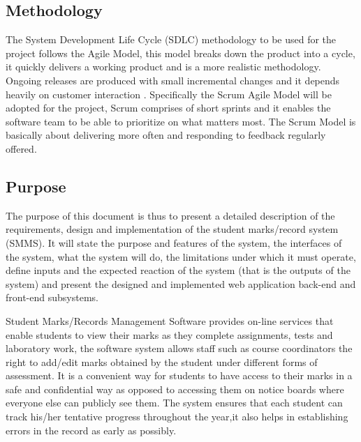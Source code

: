 \documentclass[10pt,onecolumn]{MainDocument}
\begin{document}
\subsection{Methodology}

The System Development Life Cycle (SDLC) methodology to be used for the project follows the Agile Model, this model breaks down the product into a cycle, it quickly delivers a working product and is a more realistic methodology. Ongoing releases are produced with small incremental changes and it depends heavily on customer interaction \cite{ref7}. Specifically the Scrum Agile Model will be adopted for the project, Scrum comprises of short sprints and it enables the software team to be able to prioritize on what matters most. The Scrum Model is basically about delivering more often and responding to feedback regularly offered\cite{ref8}.           

\subsection{Purpose}

The purpose of this document is thus to present a detailed description of the requirements, design and implementation of the student marks/record system (SMMS). It will state the purpose and features of the system, the interfaces of the system, what the system will do, the limitations under which it must operate, define inputs and the expected reaction of the system (that is the outputs of the system) and present the designed and implemented web application back-end and front-end subsystems. 

Student Marks/Records Management Software provides on-line services that enable students to view their marks as they complete  assignments, tests and laboratory work, the software system allows staff such as course coordinators the right to add/edit marks obtained by the student under different forms of assessment. It is a convenient way for students to have access to their marks in a safe and confidential way as opposed to accessing them on notice boards where everyone else can publicly see them. The system ensures that each student can track his/her tentative progress throughout the year,it also helps in establishing errors in the record as early as possibly. 
\end{document}
